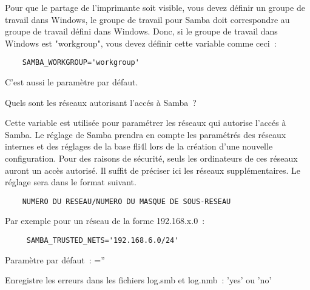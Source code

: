 \begin{description}

    Pour que le partage de l'imprimante soit visible, vous devez définir un
    groupe de travail dans Windows, le groupe de travail pour Samba doit
    correspondre au groupe de travail défini dans Windows. Donc, si le groupe
    de travail dans Windows est "workgroup", vous devez définir cette variable
    comme ceci~:

\begin{example}
\begin{verbatim}
    SAMBA_WORKGROUP='workgroup'
\end{verbatim}
\end{example}

    C'est aussi le paramètre par défaut.



    Quels sont les réseaux autorisant l'accés à Samba~?

    Cette variable est utilisée pour paramétrer les réseaux qui autorise
    l'accés à Samba.
    Le réglage de Samba prendra en compte les paramétrés des réseaux internes
    et des réglages de la base fli4l lors de la création d'une nouvelle
    configuration. Pour des raisons de sécurité, seuls les ordinateurs de ces
    réseaux auront un accès autorisé. Il suffit de préciser ici les réseaux
    supplémentaires. Le réglage sera dans le format suivant.

\begin{example}
\begin{verbatim}
    NUMERO DU RESEAU/NUMERO DU MASQUE DE SOUS-RESEAU
\end{verbatim}
\end{example}

    Par exemple pour un réseau de la forme 192.168.x.0~:

\begin{example}
\begin{verbatim}
     SAMBA_TRUSTED_NETS='192.168.6.0/24'
\end{verbatim}
\end{example}

    Paramètre par défaut~: =''


 Enregistre les erreurs dans les
fichiers log.smb et log.nmb~: 'yes' ou 'no'


\end{description}
